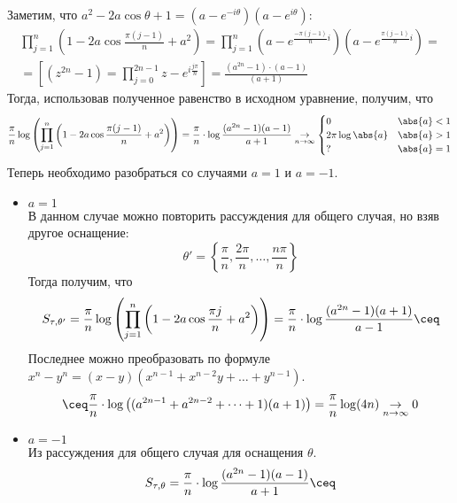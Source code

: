 \begin{example}
\begin{enumerate}
    Заметим, что $a ^ 2 - 2a \cos{\theta} + 1 = (a - e ^ {-i \theta})(a - e ^ {i \theta})$:
    \[
        \begin{gathered}
            \prod_{j = 1}^n \left(1 - 2a \cos{\frac{\pi (j - 1)}{n} + a ^ 2}\right)=
            \prod_{j = 1}^n \left(a - e ^ {\frac{-\pi (j - 1)}{n} i }\right)\left(a - e ^ {\frac{\pi (j - 1)}{n} i }\right)=\\
            =\left[(z^{2n} - 1) = \prod\limits_{j=0}^{2n - 1 }{z - e^{i\frac{j \pi}{n}}}\right]=
            \frac{(a ^ {2n} - 1) \cdot (a - 1)}{(a + 1)} 
        \end{gathered}
    \]
    Тогда, использовав полученное равенство в исходном уравнение, получим, что 
    \[
        \frac{\pi}{n} \log\left(\prod_{j = 1}^n \left(1 - 2a \cos{\frac{\pi (j - 1)}{n} + a ^ 2}\right)\right)=
        \frac{\pi}{n} \cdot \log{\frac{(a ^ {2n} - 1)(a - 1)}{a + 1}} \underset{n \to \infty}{\to}
        \begin{cases}
            0 & \abs{a} < 1 \\
            2 \pi \log{\abs{a}} & \abs{a} > 1 \\
            ? & \abs{a} = 1
        \end{cases}
    \]
    Теперь необходимо разобраться со случаями $a = 1$ и $a = -1$.
    \begin{itemize}
        \item $a = 1$\\
            В данном случае можно повторить рассуждения для общего случая, но взяв другое оснащение: 
            \[
                \theta' = \left\{\frac{\pi}{n}, \frac{2\pi}{n}, \dots, \frac{n\pi}{n}\right\}
            \] 
            Тогда получим, что 
            \[
                S_{\tau, \theta'} = \frac{\pi}{n} \log\left(\prod_{j = 1}^n \left(1 - 2a \cos{\frac{\pi j}{n} + a ^ 2}\right)\right)=
                \frac{\pi}{n} \cdot \log{\frac{(a ^ {2n} - 1)(a + 1)}{a - 1}} \ceq\\
            \] 
            Последнее можно преобразовать по формуле $x^n - y^n = (x - y)(x^{n - 1} + x^{n - 2}y + \dots + y^{n - 1})$.
            \[
                \ceq \frac{\pi}{n}\cdot \log\left((a^{2n - 1}+a^{2n - 2} + \dots + 1)(a + 1)\right) = 
                \frac{\pi}{n}\log(4n) \underset{n\to\infty}{\to} 0
            \] 
        \item $a = -1$\\
            Из рассуждения для общего случая для оснащения $\theta$.
            \[
                S_{\tau,\theta} = \frac{\pi}{n} \cdot \log{\frac{(a ^ {2n} - 1)(a - 1)}{a + 1}} \ceq
\]
\end{itemize}
\end{enumerate}
\end{example}
